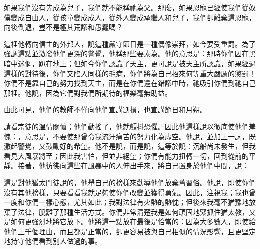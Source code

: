 如果我們沒有先成為兒子，我們就不能稱祂為父。那麼，如果恩寵已經使我們從奴僕變成自由人，從孩童變成成人，從外人變成承繼人和兒子，我們卻離棄這恩寵，向後倒退，豈不是極其荒謬和愚蠢嗎？\par

\par

這裡他轉向信主的外邦人，說這種嚴守節日是一種偶像崇拜，如今要受重罰。為了強調這點並激發他們更深的警覺，他稱那些要素為。他的意思是：那時你們因在黑暗中迷惘，趴在地上；但如今你們認識了天主，更可說是被天主所認識，如果經過這樣的對待後，你們又陷入同樣的毛病，你們將為自己招來何等重大嚴厲的懲罰！你們不是靠自己的努力找到天主，而是在你們還在錯謬中時，祂吸引你們到祂自己那裡。他說，因為它們對我們所期待的福樂毫無助益。\par

\par

由此可見，他們的教師不僅向他們宣講割損，也宣講節日和月朔。\par

\par

請看宗徒的溫情關懷；他們動搖了，他就顫抖恐懼。因此他這樣說以徹底使他們羞愧：，意思是，不要使那曾令我流汗痛苦的努力化為虛空。他說，並加上一詞，既激起警覺，又鼓勵好的希望。他不是說，而是說，這等於說：沉船尚未發生，但我看見大風暴將至；因此我害怕，但並非絕望；你們有能力扭轉一切，回到從前的平靜。接著，他彷彿向這些在風暴中的人伸出手來，將自己置身於他們中間，說：\par

\par

這是對他猶太門徒說的，他舉自己的榜樣來勸導他們放棄舊習俗。他說，即使你們沒有其他榜樣，只要看看我就足夠使你們改變並獲得勇氣。因此，注視我；我也曾一度和你們一樣心態，尤其如此；我對法律有火熱的熱忱；但後來我毫不猶豫地放棄了法律，脫離了那種生活方式。你們非常清楚我是如何頑固地緊抓住猶太教，又是如何更強烈地將它放下。他將這一點放在最後是恰當的：因為大多數人，即使給他們上千個理由，而且都是正當的，卻更容易被與自己相似的情況影響，且更堅定地持守他們看到別人做過的事。\par

